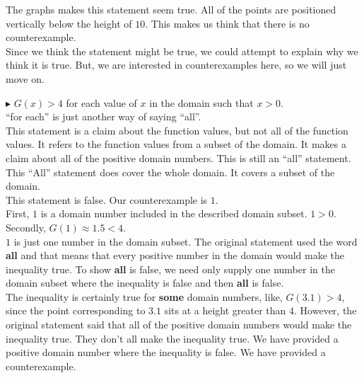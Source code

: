 \documentclass{ximera}
\begin{document}
The graphs makes this statement seem true.  All of the points are positioned vertically below the height of $10$.  This makes us think that there is no counterexample.  \\

Since we think the statement might be true, we could attempt to explain why we think it is true.  But, we are interested in counterexamples here, so we will just move on.















\textbf{\textcolor{red!90!darkgray}{$\blacktriangleright$}} $G(x) > 4$ for each value of $x$ in the domain such that $x > 0$. \\



``for each'' is just another way of saying ``all''.\\

This statement is a claim about the function values, but not all of the function values.  It refers to the function values from a subset of the domain.  It makes a claim about all of the positive domain numbers. This is still an ``all'' statement.  This ``All'' statement does cover the whole domain.  It covers a subset of the domain.\\



This statement is false. Our counterexample is $1$.  \\


First, $1$ is a domain number included in the described domain subset.  $1 > 0$. \\


Secondly, $G(1) \approx 1.5 < 4$. \\



$1$ is just one number in the domain subset.   The original statement used the word \textbf{all} and that means that every positive number in the domain would make the inequality true.  To show \textbf{all} is false, we need only supply one number in the domain subset where the inequality is false and then \textbf{all} is false. \\

The inequality is certainly true for \textbf{some} domain numbers, like, $G(3.1) > 4$, since the point corresponding to $3.1$ sits at a height greater than $4$.  However, the original statement said that all of the positive domain numbers would make the inequality true. They don't all make the inequality true.  We have provided a positive domain number where the inequality is false. We have provided a counterexample. \\
\end{document}
